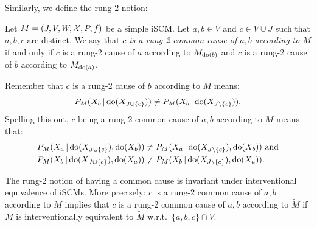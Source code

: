 Similarly, we define the rung-2 notion:
\begin{Def}\label{def:scm_rung2_common_cause_of}
  Let $M = \left ( J, V, W, \mathcal{X}, P, f \right )$ be a simple iSCM.
  Let $a, b \in V$ and $c \in V \cup J$ such that $a,b,c$ are distinct.
  We say that \emph{$c$ is a rung-2 common cause of $a,b$ according to $M$} if and only if $c$ is a rung-2 cause of $a$ according to $M_{\operatorname{do}(b)}$ and $c$ is a rung-2 cause of $b$ according to $M_{\operatorname{do}(a)}$.
\end{Def}
\begin{Rem}\label{rem:scm_rung2_common_cause_of}
  Remember that $c$ is a rung-2 cause of $b$ according to $M$ means: $$P_{M}(X_b \operatorname*{|} \operatorname{do}(X_{J \cup \{c\}})) \ne P_{M}(X_b \operatorname*{|} \operatorname{do}(X_{J\setminus\{c\}})).$$
  Spelling this out, $c$ being a rung-2 common cause of $a,b$ according to $M$ means that:
  \begin{equation*}\begin{split}
    P_{M}(X_a \operatorname*{|} \operatorname{do}(X_{J \cup \{c\}}), \operatorname{do}(X_b)) &\ne P_{M}(X_a \operatorname*{|} \operatorname{do}(X_{J\setminus\{c\}}), \operatorname{do}(X_b)) \text{ and} \\
    P_{M}(X_b \operatorname*{|} \operatorname{do}(X_{J \cup \{c\}}), \operatorname{do}(X_a)) &\ne P_{M}(X_b \operatorname*{|} \operatorname{do}(X_{J\setminus\{c\}}), \operatorname{do}(X_a)).
  \end{split}\end{equation*}
\end{Rem}
\begin{Rem}\label{rem:scm_rung2_common_cause_of_interventional_equivalence}
  The rung-2 notion of having a common cause is invariant under interventional equivalence of iSCMs.
  More precisely: $c$ is a rung-2 common cause of $a,b$ according to $M$ implies that $c$ is a rung-2 common cause of $a,b$ according to $\tilde{M}$ if $M$ is interventionally equivalent to $\tilde{M}$ w.r.t.\ $\{a,b,c\} \cap V$.
\end{Rem}


